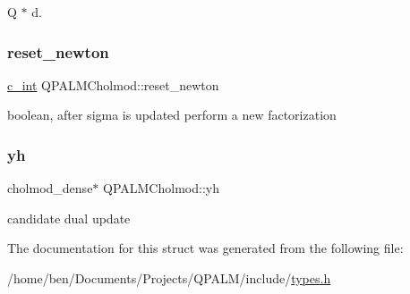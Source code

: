 Q $\ast$ d. 

\mbox{\label{structQPALMCholmod_a5d243ea350665531164a8b355ac7c370}} 
\subsubsection{\texorpdfstring{reset\_newton}{reset\_newton}}
{\footnotesize\ttfamily \mbox{\hyperlink{global__opts_8h_aa3217a0f49d3e52b74e9dd830c44472f}{c\+\_\+int}} Q\+P\+A\+L\+M\+Cholmod\+::reset\+\_\+newton}



boolean, after sigma is updated perform a new factorization 

\mbox{\label{structQPALMCholmod_afec81875b9a1a98a6984d0b607cdd28e}} 
\subsubsection{\texorpdfstring{yh}{yh}}
{\footnotesize\ttfamily cholmod\+\_\+dense$\ast$ Q\+P\+A\+L\+M\+Cholmod\+::yh}



candidate dual update 



The documentation for this struct was generated from the following file\+:\begin{DoxyCompactItemize}
\item 
/home/ben/\+Documents/\+Projects/\+Q\+P\+A\+L\+M/include/\mbox{\hyperlink{types_8h}{types.\+h}}\end{DoxyCompactItemize}

